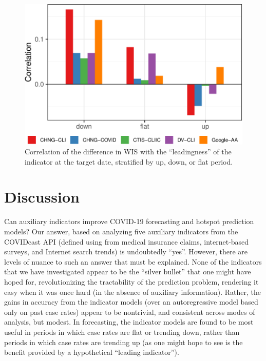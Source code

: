\documentclass[9pt,twocolumn,twoside,lineno]{pnas-new}
\begin{document}
\begin{figure}[t]
  \includegraphics[width=\columnwidth]{fig/leading-only-1.pdf}
  \caption{Correlation of the difference in WIS with the ``leadingness'' of the
    indicator at the target date, stratified by up, down, or flat period.} 
  \label{fig:leading}
\end{figure}

\section{Discussion}

Can auxiliary indicators improve COVID-19 forecasting and hotspot prediction
models?  Our answer, based on analyzing five auxiliary indicators from the
COVIDcast API (defined using from medical insurance claims, internet-based
surveys, and Internet search trends) is undoubtedly ``yes''. However, there are
levels of nuance to such an answer that must be explained.  None of the
indicators that we have investigated appear to be the ``silver bullet'' that one
might have hoped for, revolutionizing the tractability of the prediction
problem, rendering it easy when it was once hard (in the absence of auxiliary
information).  Rather, the gains in accuracy from the indicator models (over an
autoregressive model based only on past case rates) appear to be nontrivial, and
consistent across modes of analysis, but modest.  In forecasting, the indicator
models are found to be most useful in periods in which case rates are flat or
trending down, rather than periods in which case rates are trending up (as one
might hope to see is the benefit provided by a hypothetical ``leading
indicator'').
\end{document}
